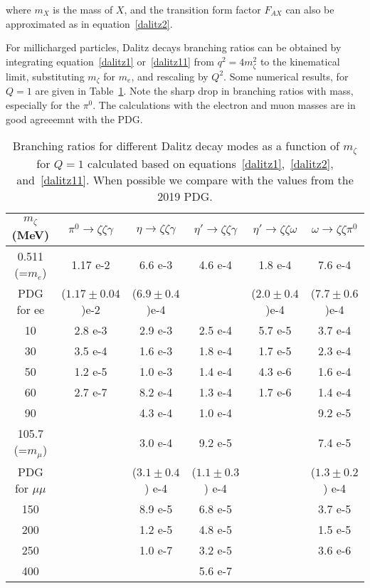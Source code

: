 \documentclass[12pt]{article}
\begin{document}
\noindent where $m_X$ is the mass of $X$, and the
transition
form factor $F_{AX}$ can also be approximated as in equation~\ref{dalitz2}.

For millicharged particles, Dalitz decays branching ratios 
can be obtained by integrating equation~\ref{dalitz1} or~\ref{dalitz11}
from 
$q^2=4m^2_\zeta$ to the kinematical limit, substituting $m_\zeta$ for 
$m_e$, and rescaling by $Q^2$.
Some numerical results, for $Q=1$ are given in Table~\ref{tab:dalitz1}.  Note the
sharp drop in branching ratios with mass, especially for the $\pi^0$.
The calculations
with the electron and muon masses are in good agreeemnt with the PDG.



\begin{table}
  \begin{center}
    { \small
  \begin{tabular}{|c|c|c|c|c|c|}
    \hline
    $m_\zeta$ (MeV) & $\pi^0 \to \zeta \zeta \gamma$ & $\eta \to \zeta \zeta \gamma$
    & $\eta' \to \zeta \zeta \gamma$ & $\eta' \to \zeta \zeta \omega$
    & $\omega \to \zeta \zeta \pi^0$ \\ \hline \hline
  0.511 (=$m_e$)  & 1.17 e-2 & 6.6 e-3 & 4.6 e-4 & 1.8 e-4 & 7.6 e-4 \\
  PDG for ee  & ($1.17 \pm 0.04$)e-2 & ($6.9 \pm 0.4$)e-4 &   &
  ($2.0 \pm 0.4$)e-4  & ($7.7 \pm 0.6$)e-4 \\ \hline
  10              & 2.8 e-3  & 2.9 e-3 & 2.5 e-4 & 5.7 e-5 & 3.7 e-4 \\
  30              & 3.5 e-4  & 1.6 e-3 & 1.8 e-4 & 1.7 e-5 & 2.3 e-4 \\
  50              & 1.2 e-5  & 1.0 e-3 & 1.4 e-4 & 4.3 e-6 & 1.6 e-4 \\
  60              & 2.7 e-7  & 8.2 e-4 & 1.3 e-4 & 1.7 e-6 & 1.4 e-4 \\
  90              &         & 4.3 e-4 & 1.0 e-4 &        & 9.2 e-5 \\ \hline
  105.7 (=$m_\mu$)&         & 3.0 e-4 & 9.2 e-5 &         & 7.4 e-5 \\
  PDG for $\mu\mu$ &      & ($3.1 \pm 0.4$) e-4 & ($1.1 \pm 0.3$) e-4 & &
                      ($1.3 \pm 0.2$) e-4 \\ \hline
  150             &        & 8.9 e-5  & 6.8 e-5 &        & 3.7 e-5 \\
  200             &        & 1.2 e-5  & 4.8 e-5 &        & 1.5 e-5 \\
  250             &        & 1.0 e-7 & 3.2 e-5 &         & 3.6 e-6 \\
  400             &        &        & 5.6 e-7 &         &        \\ \hline 
  \end{tabular}
  }
  \caption{\protect Branching ratios for different Dalitz decay modes as
    a function of $m_\zeta$ for $Q=1$ calculated
    based on equations~\ref{dalitz1},~\ref{dalitz2}, and~\ref{dalitz11}.
When possible we compare with
  the values from the 2019 PDG.}
\label{tab:dalitz1}
  \end{center}
\end{table}
\end{document}
